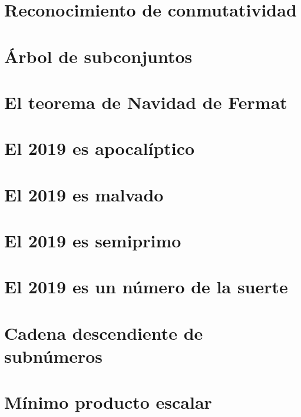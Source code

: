 \documentclass[a4paper,12pt,twoside]{book}
\begin{document}
\chapter{Reconocimiento de conmutatividad}
\label{181227}

\chapter{Árbol de subconjuntos}
\label{181228}


\chapter{El teorema de Navidad de Fermat}
\label{181231}

\chapter{El 2019 es apocalíptico}
\label{190101}

\chapter{El 2019 es malvado}
\label{190102}

\chapter{El 2019 es semiprimo}
\label{190103}

\chapter{El 2019 es un número de la suerte}
\label{190104}


\chapter{Cadena descendiente de subnúmeros}
\label{190107}

\chapter{Mínimo producto escalar}
\label{190108}
\end{document}
